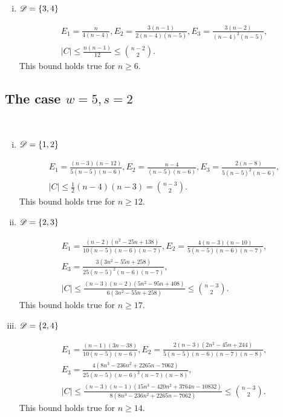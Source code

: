 \documentclass{amsart}
\begin{document}
{\begin{enumerate}[(i)]
\begin{gather*}
E_1=\frac{n}{2(n-4)}, E_2=\frac{(n-2)(n-12)}{(n-4)(n-5)(n-6)}, E_3=\frac{4(n-3)(n-8)}{ (n-6) (n-5) (n-4)^2},\\
|C|\le \frac{n(n-2)}{8}\le \binom{n-2}2.
\end{gather*}
This bound holds true for $n\ge 12.$


\item $\mathscr{D}=\{3,4\}$

\begin{gather*}
E_1=\frac{n}{4(n-4)}, E_2=\frac{3(n-1)}{2(n-4)(n-5)}, E_3=\frac{3 (n-2)}{(n-4)^2 (n-5)},\\
|C|\le \frac{n(n-1)}{12}\le \binom{n-2}2.
\end{gather*}
This bound holds true for $n\ge 6.$

\end{enumerate}
  
\subsection{The case \texorpdfstring{$w=5,s=2$}.}  \label{App:5,2}\hfill\\

\begin{enumerate}[(i)]
\item $\mathscr{D}=\{1,2\}$

\begin{gather*}
 E_1=\frac{(n-3)(n-12)}{5(n-5) (n-6)},E_2=\frac{n-4}{ (n-5)(n-6)},E_3=\frac{2 (n-8)}{5 (n-5)^2 (n-6)},\\
 |C|\le\frac{1}{2} (n-4) (n-3)=\binom{n-3}{2}.
\end{gather*}
This bound holds true for $n\ge 12$.

\item $\mathscr{D}=\{2,3\}$

\begin{gather*}
E_1=\frac{(n-2)(n^2-25n+138)}{10 (n-5)(n-6) (n-7)}, E_2=\frac{4(n-3)(n-10)}{5(n-5)(n-6)(n-7)}, \\
E_3=\frac{3 \left(3 n^2-55 n+258\right)}{25 (n-5)^2(n-6) (n-7) },\\
|C|\le\frac{(n-3) (n-2) \left(5 n^2-95 n+408\right)}{6 \left(3 n^2-55 n+258\right)}\le\binom{n-3}2.
\end{gather*}
This bound holds true for $n\ge17$.

\item $\mathscr{D}=\{2,4\}$

\begin{gather*}
E_1=\frac{(n-1)(3n-38)}{10 (n-5)(n-6)},E_2=\frac{2(n-3)(2n^2-45n+244)}{5(n-5)(n-6)(n-7)(n-8)},\\
E_3=\frac{4 \left(8 n^3-236 n^2+2265 n-7062\right)}{25(n-5)(n-6)^2(n-7) (n-8) },\\
|C|\le\frac{(n-3) (n-1) \left(15 n^3-420 n^2+3764 n-10832\right)}{8 \left(8 n^3-236 n^2+2265 n-7062\right)}\le\binom{n-3}2.
\end{gather*}
This bound holds true for $n\ge 14.$


\end{enumerate}}
\end{document}

